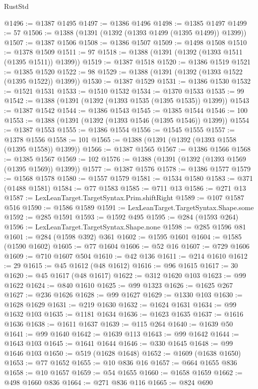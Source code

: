 \begin{lexlean}{RustStd}
\begin{coremodule}
@1496 := @1387 @1495
@1497 := @1386 @1496
@1498 := @1385 @1497
@1499 := 57
@1506 := @1388 (@1391 (@1392 (@1393 @1499 (@1395 @1499)) @1399))
@1507 := @1387 @1506
@1508 := @1386 @1507
@1509 := @1498 @1508
@1510 := @1378 @1509
@1511 := 97
@1518 := @1388 (@1391 (@1392 (@1393 @1511 (@1395 @1511)) @1399))
@1519 := @1387 @1518
@1520 := @1386 @1519
@1521 := @1385 @1520
@1522 := 98
@1529 := @1388 (@1391 (@1392 (@1393 @1522 (@1395 @1522)) @1399))
@1530 := @1387 @1529
@1531 := @1386 @1530
@1532 := @1521 @1531
@1533 := @1510 @1532
@1534 := @1370 @1533
@1535 := 99
@1542 := @1388 (@1391 (@1392 (@1393 @1535 (@1395 @1535)) @1399))
@1543 := @1387 @1542
@1544 := @1386 @1543
@1545 := @1385 @1544
@1546 := 100
@1553 := @1388 (@1391 (@1392 (@1393 @1546 (@1395 @1546)) @1399))
@1554 := @1387 @1553
@1555 := @1386 @1554
@1556 := @1545 @1555
@1557 := @1378 @1556
@1558 := 101
@1565 := @1388 (@1391 (@1392 (@1393 @1558 (@1395 @1558)) @1399))
@1566 := @1387 @1565
@1567 := @1386 @1566
@1568 := @1385 @1567
@1569 := 102
@1576 := @1388 (@1391 (@1392 (@1393 @1569 (@1395 @1569)) @1399))
@1577 := @1387 @1576
@1578 := @1386 @1577
@1579 := @1568 @1578
@1580 := @1557 @1579
@1581 := @1534 @1580
@1583 := @371 (@1488 @1581)
@1584 := @77 @1583
@1585 := @711 @13
@1586 := @271 @13
@1587 := LexLeanTarget.TargetSyntax.Prim.shiftRight
@1589 := @107 @1587 @516
@1590 := @1586 @1589
@1591 := LexLeanTarget.TargetSyntax.Shape.some
@1592 := @285 @1591
@1593 := @1592 @495
@1595 := @284 (@1593 @264)
@1596 := LexLeanTarget.TargetSyntax.Shape.none
@1598 := @285 @1596 @81
@1601 := @284 (@1598 @392) @361
@1602 := @1595 @1601
@1604 := @1585 (@1590 @1602)
@1605 := @77 @1604
@1606 := @52 @16
@1607 := @729 @1606
@1609 := @710 @1607 @504
@1610 := @42 @136
@1611 := @214 @1610
@1612 := 29
@1615 := @45 @1612 (@48 @1612)
@1616 := @96 @1615
@1617 := 30
@1620 := @45 @1617 (@48 @1617)
@1622 := @312 @1620 @103
@1623 := @99 @1622
@1624 := @840 @1610
@1625 := @99 @1323
@1626 := @1625 @267
@1627 := @236 @1626
@1628 := @99 @1627
@1629 := @1330 @103
@1630 := @1628 @1629
@1631 := @219 @1630
@1632 := @1624 @1631
@1634 := @99 @1632 @103
@1635 := @1181 @1634
@1636 := @1623 @1635
@1637 := @1616 @1636
@1638 := @1611 @1637
@1639 := @115 @264
@1640 := @1639 @50
@1641 := @99 @1640
@1642 := @1639 @113
@1643 := @99 @1642
@1644 := @1643 @103
@1645 := @1641 @1644
@1646 := @330 @1645
@1648 := @99 @1646 @103
@1650 := @519 (@1628 @1648)
@1652 := @1609 (@1638 @1650)
@1653 := @77 @1652
@1655 := @10 @836 @16
@1657 := @664 @1655 @836
@1658 := @10 @1657
@1659 := @54 @1655
@1660 := @1658 @1659
@1662 := @498 @1660 @836
@1664 := @271 @836 @116
@1665 := @824 @690

\end{coremodule}
\end{lexlean}
